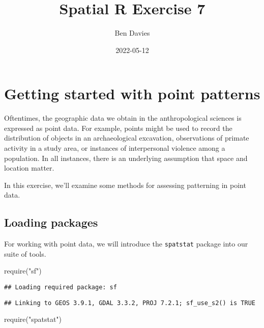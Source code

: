 \documentclass[
]{book}
\title{Spatial R Exercise 7}
\author{Ben Davies}
\date{2022-05-12}
\newenvironment{Shaded}{\begin{snugshade}}{\end{snugshade}}
\newcommand{\FunctionTok}[1]{\textcolor[rgb]{0.00,0.00,0.00}{#1}}
\newcommand{\NormalTok}[1]{#1}
\newcommand{\StringTok}[1]{\textcolor[rgb]{0.31,0.60,0.02}{#1}}
\begin{document}
\maketitle

{
\setcounter{tocdepth}{1}
\tableofcontents
}
\hypertarget{getting-started-with-point-patterns}{%
\chapter{Getting started with point patterns}\label{getting-started-with-point-patterns}}

Oftentimes, the geographic data we obtain in the anthropological sciences is expressed as point data. For example, points might be used to record the distribution of objects in an archaeological excavation, observations of primate activity in a study area, or instances of interpersonal violence among a population. In all instances, there is an underlying assumption that space and location matter.

In this exercise, we'll examine some methods for assessing patterning in point data.

\hypertarget{loading-packages}{%
\section{Loading packages}\label{loading-packages}}

For working with point data, we will introduce the \texttt{spatstat} package into our suite of tools.

\begin{Shaded}
\begin{Highlighting}[]
\FunctionTok{require}\NormalTok{(}\StringTok{"sf"}\NormalTok{)}
\end{Highlighting}
\end{Shaded}

\begin{verbatim}
## Loading required package: sf
\end{verbatim}

\begin{verbatim}
## Linking to GEOS 3.9.1, GDAL 3.3.2, PROJ 7.2.1; sf_use_s2() is TRUE
\end{verbatim}

\begin{Shaded}
\begin{Highlighting}[]
\FunctionTok{require}\NormalTok{(}\StringTok{"spatstat"}\NormalTok{)}
\end{Highlighting}
\end{Shaded}
\end{document}
